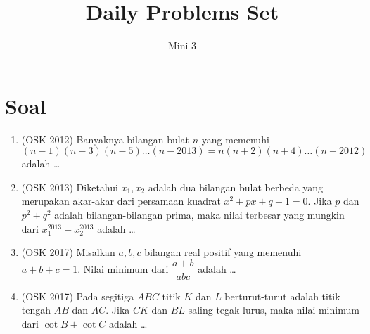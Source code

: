 \documentclass[12pt]{scrartcl}
\begin{document}
	\title{Daily Problems Set} %
	\date{}
	\author{Mini 3}
	\maketitle

\renewcommand*\contentsname{Daftar Isi}
\tableofcontents

\newpage

	\section{Soal}
	\begin{enumerate}
            \item (OSK 2012) Banyaknya bilangan bulat $n$ yang memenuhi $$(n-1)(n-3)(n-5)\dots(n-2013)=n(n+2)(n+4)\dots (n+2012)$$ adalah \dots
        
            \item (OSK 2013) Diketahui $x_1,x_2$ adalah dua bilangan bulat berbeda yang merupakan akar-akar dari persamaan kuadrat $x^2+px+q+1=0$. Jika $p$ dan $p^2+q^2$ adalah bilangan-bilangan prima, maka nilai terbesar yang mungkin dari $x_1^{2013}+x_2^{2013}$ adalah \dots
            
            \item (OSK 2017) Misalkan $a,b,c$ bilangan real positif yang memenuhi $a+b+c=1$. Nilai minimum dari $\dfrac{a+b}{abc}$ adalah \dots
            
            \item (OSK 2017) Pada segitiga $ABC$ titik $K$ dan $L$ berturut-turut adalah titik tengah $AB$ dan $AC$. Jika $CK$ dan $BL$ saling tegak lurus, maka nilai minimum dari $\cot B + \cot C$ adalah \dots
	\end{enumerate}
	
\end{document}
